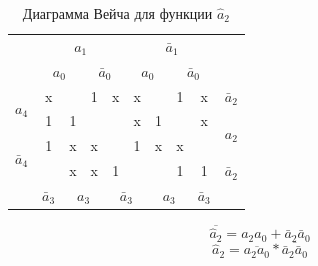\documentclass[a4paper,14pt]{article}
\begin{document}
\begin{table}[H]
				\begin{center}
		\caption{\label{tab:a2_preobr} Диаграмма Вейча для функции $\hat{a}_2$}

		\begin{tabular}{cccccccccc}
			& \multicolumn{4}{c}{$a_1$} & \multicolumn{4}{c}{$\bar{a}_1$} &  \\
			& \multicolumn{2}{c}{$a_0$} & \multicolumn{2}{c}{$\bar{a}_0$} & \multicolumn{2}{c}{$a_0$} & \multicolumn{2}{c}{$\bar{a}_0$} &  \\ \cline{2-9}
			\multicolumn{1}{c|}{\multirow{2}{*}{$a_4$}} & \multicolumn{1}{c|}{x} & \multicolumn{1}{c|}{} & \multicolumn{1}{c|}{1} & \multicolumn{1}{c|}{x} & \multicolumn{1}{c|}{x} & \multicolumn{1}{c|}{} & \multicolumn{1}{c|}{1} & \multicolumn{1}{c|}{x} & $\bar{a}_2$ \\ \cline{2-9}
			\multicolumn{1}{c|}{} & \multicolumn{1}{c|}{1} & \multicolumn{1}{c|}{1} & \multicolumn{1}{c|}{} & \multicolumn{1}{c|}{} & \multicolumn{1}{c|}{x} & \multicolumn{1}{c|}{1} & \multicolumn{1}{c|}{} & \multicolumn{1}{c|}{x} & \multirow{2}{*}{$a_2$} \\ \cline{2-9}
			\multicolumn{1}{c|}{\multirow{2}{*}{$\bar{a}_4$}} & \multicolumn{1}{c|}{1} & \multicolumn{1}{c|}{x} & \multicolumn{1}{c|}{x} & \multicolumn{1}{c|}{} & \multicolumn{1}{c|}{1} & \multicolumn{1}{c|}{x} & \multicolumn{1}{c|}{x} & \multicolumn{1}{c|}{} &  \\ \cline{2-9}
			\multicolumn{1}{c|}{} & \multicolumn{1}{c|}{} & \multicolumn{1}{c|}{x} & \multicolumn{1}{c|}{x} & \multicolumn{1}{c|}{1} & \multicolumn{1}{c|}{} & \multicolumn{1}{c|}{} & \multicolumn{1}{c|}{1} & \multicolumn{1}{c|}{1} & $\bar{a}_2$ \\ \cline{2-9}
			& $\bar{a}_3$ & \multicolumn{2}{c}{$a_3$} & \multicolumn{2}{c}{$\bar{a}_3$} & \multicolumn{2}{c}{$a_3$} & $\bar{a}_3$ & 
		\end{tabular}

\end{center}
\end{table}

$$\overline{\hat{a}_2} = a_2 a_0 + \bar{a}_2\bar{a}_0$$
$$\hat{a}_2 = \overline{a_2 a_0} * \overline{\bar{a}_2\bar{a}_0}$$


\end{document}
